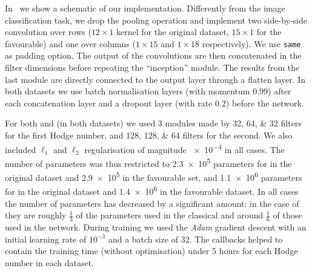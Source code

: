 In~ we show a schematic of our implementation.
Differently from the image classification task, we drop the pooling operation and implement two side-by-side convolution over rows ($12 \times 1$ kernel for the original dataset, $15 \times 1$ for the favourable) and one over columns ($1 \times 15$ and $1 \times 18$ respectively).\footnotemark{}
We use \texttt{same} as padding option.
The output of the convolutions are then concatenated in the filter dimensions before repeating the ``inception'' module.
The results from the last module are directly connected to the output layer through a flatten layer.
In both datasets we use batch normalisation layers (with momentum $0.99$) after each concatenation layer and a dropout layer (with rate $0.2$) before the \fc network.\footnotemark{}

For both  and  (in both datasets) we used 3 modules made by \numlist{32;64;32} filters for the first Hodge number, and \numlist{128;128;64} filters for the second.
We also included $\ell_1$ and $\ell_2$ regularisation of magnitude \num{e-4} in all cases.
The number of parameters was thus restricted to \num{2.3e5} parameters for  in the original dataset and \num{2.9e5} in the favourable set, and \num{1.1e6} parameters for  in the original dataset and \num{1.4e6} in the favourable dataset.
In all cases the number of parameters has decreased by a significant amount: in the case of  they are roughly $\frac{1}{3}$ of the parameters used in the classical \cnn and around $\frac{1}{6}$ of those used in the \fc network.
During training we used the \emph{Adam} gradient descent with an initial learning rate of $10^{-3}$ and a batch size of $32$.
The callbacks helped to contain the training time (without optimisation) under 5 hours for each Hodge number in each dataset.

